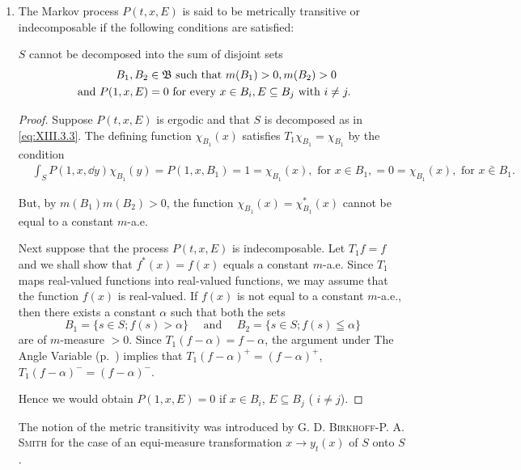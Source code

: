 \begin{enumerate}[1.]
\item The Markov process $P(t, x, E)$ is said to be metrically transitive or indecomposable if the following conditions are satisfied: 

$S$ cannot be decomposed into the sum of disjoint sets 
\begin{align}
B _{1}, B _{2}& \in \mathfrak {B} \text{ such that } m (B _{1}) > 0, m (B _{2}) > 0 \notag \\
\text{ and } P (1, x, E)& = 0 \text{ for every } x \in B _{i}, E \subseteq B _{j} \text{ with } i \neq j. \label{eq:XIII.3.3}
\end{align}

\begin{proof}
 Suppose $P(t, x, E)$ is ergodic and that $S$ is decomposed as in \eqref{eq:XIII.3.3}. The defining function $\chi_{B_1}(x)$ satisfies $T_1\chi_{B_1} = \chi_{B_1}$ by the condition 
\[ \begin{aligned}
&\int_{S} P (1, x, \dd y) \chi_ {B _{1}} (y) = P (1, x, B _{1}) = 1 = \chi_ {B _{1}} (x),  \text{ for } x \in B _{1}, = 0 = \chi_ {B _{1}} (x),  \text{ for } x \bar {\in} B _{1}.
\end{aligned}
\]

But, by $m(B_1)m(B_2) > 0$, the function $\chi_{B_1}(x) = \chi_{B_1}^*(x)$ cannot be equal to a constant $m$-a.e. 


Next suppose that the process $P(t,x,E)$ is indecomposable. Let $T_{1}f=f$ and we shall show that $f^{*}(x)=f(x)$ equals a constant $m$-a.e. Since $T_{1}$ maps real-valued functions into real-valued functions, we may assume that the function $f(x)$ is real-valued. If $f(x)$ is not equal to a constant $m$-a.e., then there exists a constant $\alpha$ such that both the sets 
\[
B _{1} = \{s \in S; f (s) > \alpha \} \quad \text{ and } \quad B _{2} = \{s \in S; f (s) \leqq \alpha \}
\]
are of $m$-measure $> 0$. Since $T_{1}(f - \alpha) = f - \alpha$, the argument under The Angle Variable (p.~\pageref{sec:XIII.3}) implies that $T_{1}(f - \alpha)^{+} = (f - \alpha)^{+}$, $T_{1}(f - \alpha)^{-} = (f - \alpha)^{-}$. 

Hence we would obtain $P(1, x, E) = 0$ if $x \in B_i$, $E \subseteq B_j$ ( $i \neq j$).
\end{proof}

\begin{remarku} The notion of the metric transitivity was introduced by G. D. \textsc{Birkhoff}-P. A. \textsc{Smith} \cite{birkhoff19} for the case of an equi-measure transformation $x \rightarrow y_{t}(x)$ of $S$ onto $S$. 
\end{remarku}


\end{enumerate}
